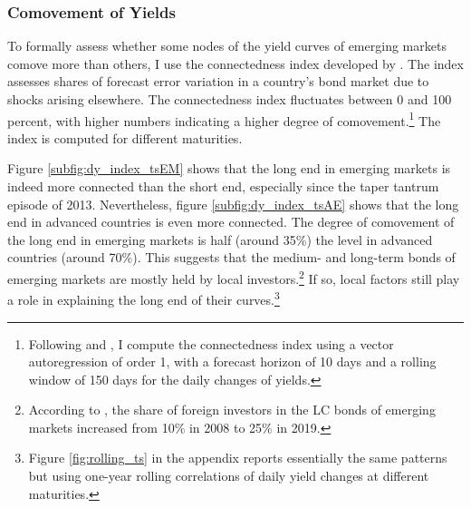 {\subsubsection{Comovement of Yields}
To formally assess whether some nodes of the yield curves of emerging markets comove more than others, I use the connectedness index developed by \cite{DieboldYilmaz:2014}. The index assesses shares of forecast error variation in a country's bond market due to shocks arising elsewhere. The connectedness index fluctuates between 0 and 100 percent, with higher numbers indicating a higher degree of comovement.\footnote{ Following \cite{ACDM:2019} and \cite{BostanciYilmaz:2020}, I compute the connectedness index using a vector autoregression of order 1, with a forecast horizon of 10 days and a rolling window of 150 days for the daily changes of yields.} The index is computed for different maturities.

Figure \ref{subfig:dy_index_tsEM} shows that the long end in emerging markets is indeed more connected than the short end, especially since the taper tantrum episode of 2013. 
Nevertheless, figure \ref{subfig:dy_index_tsAE} shows that the long end in advanced countries is even more connected. The degree of comovement of the long end in emerging markets is half (around 35\%) the level in advanced countries (around 70\%).
This suggests that the medium- and long-term bonds of emerging markets are mostly held by local investors.\footnote{ According to \cite{KolasaWesolowski:2020}, the share of foreign investors in the LC bonds of emerging markets increased from 10\% in 2008 to 25\% in 2019.}
If so, local factors still play a role in explaining the long end of their curves.\footnote{ Figure \ref{fig:rolling_ts} in the appendix reports essentially the same patterns but using one-year rolling correlations of daily  yield changes at different maturities.}

}
